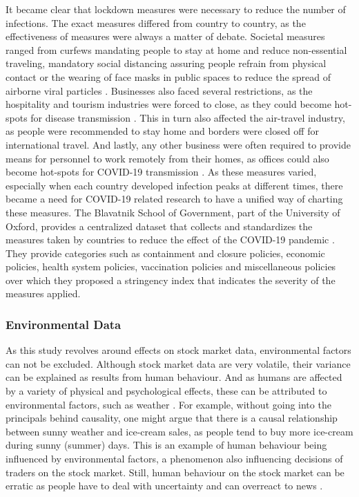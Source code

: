 It became clear that lockdown measures were necessary to reduce the number of infections. The exact measures differed from country to country, as the effectiveness of measures were always a matter of debate. Societal measures ranged from curfews mandating people to stay at home and reduce non-essential traveling, mandatory social distancing assuring people refrain from physical contact \cite{lewnard2020scientific} or the wearing of face masks in public spaces to reduce the spread of airborne viral particles \cite{eikenberry2020}. Businesses also faced several restrictions, as the hospitality and tourism industries were forced to close, as they could become hot-spots for disease transmission \cite{gossling2020pandemics}. This in turn also affected the air-travel industry, as people were recommended to stay home and borders were closed off for international travel. And lastly, any other business were often required to provide means for personnel to work remotely from their homes, as offices could also become hot-spots for COVID-19 transmission \cite{dingel2020many}. As these measures varied, especially when each country developed infection peaks at different times, there became a need for COVID-19 related research to have a unified way of charting these measures. The Blavatnik School of Government, part of the University of Oxford, provides a centralized dataset that collects and standardizes the measures taken by countries to reduce the effect of the COVID-19 pandemic \cite{hale2020variation}. They provide categories such as containment and closure policies, economic policies, health system policies, vaccination policies and miscellaneous policies over which they proposed a stringency index that indicates the severity of the measures applied.

\subsubsection{Environmental Data}

As this study revolves around effects on stock market data, environmental factors can not be excluded. Although stock market data are very volatile, their variance can be explained as results from human behaviour. And as humans are affected by a variety of physical and psychological effects, these can be attributed to environmental factors, such as weather \cite{hirshleifer2003good}. For example, without going into the principals behind causality, one might argue that there is a causal relationship between sunny weather and ice-cream sales, as people tend to buy more ice-cream during sunny (summer) days. This is an example of human behaviour being influenced by environmental factors, a phenomenon also influencing decisions of traders on the stock market. Still, human behaviour on the stock market can be erratic as people have to deal with uncertainty \cite{tversky1974judgment} and can overreact to news \cite{de1985does}.

